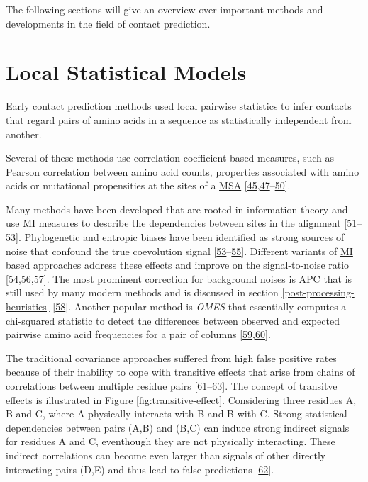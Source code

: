 \documentclass[11pt,a4paper,twoside]{book}
\theoremstyle{definition}
\theoremstyle{definition}
\theoremstyle{remark}
\begin{document}
The following sections will give an overview over important methods and
developments in the field of contact prediction.

\section{Local Statistical Models}\label{local-methods}

Early contact prediction methods used local pairwise statistics to infer
contacts that regard pairs of amino acids in a sequence as statistically
independent from another.

Several of these methods use correlation coefficient based measures,
such as Pearson correlation between amino acid counts, properties
associated with amino acids or mutational propensities at the sites of a
\protect\hyperlink{abbrev}{MSA}
{[}\protect\hyperlink{ref-Gobel1994}{45},\protect\hyperlink{ref-Neher1994}{47}--\protect\hyperlink{ref-Shindyalov1994}{50}{]}.

Many methods have been developed that are rooted in information theory
and use \protect\hyperlink{abbrev}{MI} measures to describe the
dependencies between sites in the alignment
{[}\protect\hyperlink{ref-Clarke1995}{51}--\protect\hyperlink{ref-Martin2005}{53}{]}.
Phylogenetic and entropic biases have been identified as strong sources
of noise that confound the true coevolution signal
{[}\protect\hyperlink{ref-Martin2005}{53}--\protect\hyperlink{ref-Fodor2004}{55}{]}.
Different variants of \protect\hyperlink{abbrev}{MI} based approaches
address these effects and improve on the signal-to-noise ratio
{[}\protect\hyperlink{ref-Atchley2000}{54},\protect\hyperlink{ref-Tillier2003}{56},\protect\hyperlink{ref-Gouveia_Oliveira2007}{57}{]}.
The most prominent correction for background noises is
\protect\hyperlink{abbrev}{APC} that is still used by many modern
methods and is discussed in section \ref{post-processing-heuristics}
{[}\protect\hyperlink{ref-Dunn2008}{58}{]}. Another popular method is
\emph{OMES} that essentially computes a chi-squared statistic to detect
the differences between observed and expected pairwise amino acid
frequencies for a pair of columns
{[}\protect\hyperlink{ref-Kass2002}{59},\protect\hyperlink{ref-Noivirt2005}{60}{]}.

The traditional covariance approaches suffered from high false positive
rates because of their inability to cope with transitive effects that
arise from chains of correlations between multiple residue pairs
{[}\protect\hyperlink{ref-Lapedes1999}{61}--\protect\hyperlink{ref-Weigt2009}{63}{]}.
The concept of transitve effects is illustrated in Figure
\ref{fig:transitive-effect}. Considering three residues A, B and C,
where A physically interacts with B and B with C. Strong statistical
dependencies between pairs (A,B) and (B,C) can induce strong indirect
signals for residues A and C, eventhough they are not physically
interacting. These indirect correlations can become even larger than
signals of other directly interacting pairs (D,E) and thus lead to false
predictions {[}\protect\hyperlink{ref-Burger2010}{62}{]}.
\end{document}
